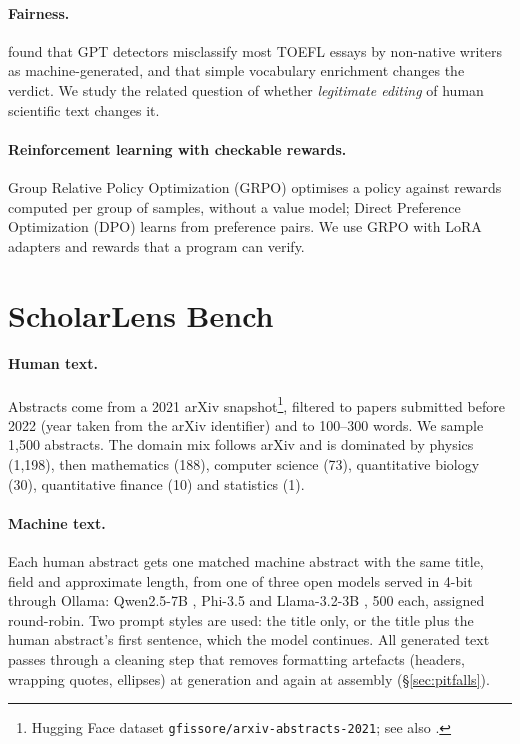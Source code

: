 \documentclass[11pt]{article}
\begin{document}
\paragraph{Fairness.}
\citet{liang2023biased} found that GPT detectors misclassify most TOEFL essays by non-native writers as machine-generated, and that simple vocabulary enrichment changes the verdict.
We study the related question of whether \emph{legitimate editing} of human scientific text changes it.

\paragraph{Reinforcement learning with checkable rewards.}
Group Relative Policy Optimization (GRPO) \citep{shao2024deepseekmath} optimises a policy against rewards computed per group of samples, without a value model; Direct Preference Optimization (DPO) \citep{rafailov2023dpo} learns from preference pairs.
We use GRPO with LoRA adapters \citep{hu2022lora} and rewards that a program can verify.

\section{ScholarLens Bench}
\label{sec:bench}

\paragraph{Human text.}
Abstracts come from a 2021 arXiv snapshot\footnote{Hugging Face dataset \texttt{gfissore/arxiv-abstracts-2021}; see also \citet{clement2019arxiv}.}, filtered to papers submitted before 2022 (year taken from the arXiv identifier) and to 100--300 words.
We sample 1{,}500 abstracts.
The domain mix follows arXiv and is dominated by physics (1{,}198), then mathematics (188), computer science (73), quantitative biology (30), quantitative finance (10) and statistics (1).

\paragraph{Machine text.}
Each human abstract gets one matched machine abstract with the same title, field and approximate length, from one of three open models served in 4-bit through Ollama: Qwen2.5-7B \citep{qwen2024qwen25}, Phi-3.5 \citep{abdin2024phi3} and Llama-3.2-3B \citep{dubey2024llama3}, 500 each, assigned round-robin.
Two prompt styles are used: the title only, or the title plus the human abstract's first sentence, which the model continues.
All generated text passes through a cleaning step that removes formatting artefacts (headers, wrapping quotes, ellipses) at generation and again at assembly (\S\ref{sec:pitfalls}).
\end{document}
